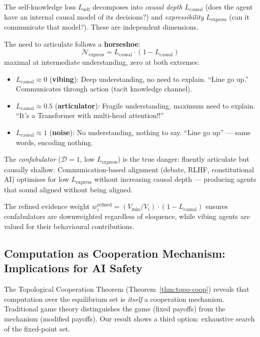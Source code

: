 \documentclass[11pt,a4paper]{article}
\begin{document}
The self-knowledge loss $L_{\text{self}}$ decomposes into \emph{causal depth} $L_{\text{causal}}$ (does the agent have an internal causal model of its decisions?) and \emph{expressibility} $L_{\text{express}}$ (can it communicate that model?). These are independent dimensions.

The need to articulate follows a \textbf{horseshoe}:
\begin{equation*}
    \mathcal{N}_{\text{express}} = L_{\text{causal}} \cdot (1 - L_{\text{causal}})
\end{equation*}
maximal at intermediate understanding, zero at both extremes:
\begin{itemize}
    \item $L_{\text{causal}} \approx 0$ (\textbf{vibing}): Deep understanding, no need to explain. ``Line go up.'' Communicates through action (tacit knowledge channel).
    \item $L_{\text{causal}} \approx 0.5$ (\textbf{articulator}): Fragile understanding, maximum need to explain. ``It's a Transformer with multi-head attention!!''
    \item $L_{\text{causal}} \approx 1$ (\textbf{noise}): No understanding, nothing to say. ``Line go up'' --- same words, encoding nothing.
\end{itemize}

The \emph{confabulator} ($\mathcal{D} = 1$, low $L_{\text{express}}$) is the true danger: fluently articulate but causally shallow. Communication-based alignment (debate, RLHF, constitutional AI) optimises for low $L_{\text{express}}$ without increasing causal depth --- producing agents that sound aligned without being aligned.

The refined evidence weight $w_i^{\text{refined}} = (V_{\min}/V_i) \cdot (1 - L_{\text{causal}})$ ensures confabulators are downweighted regardless of eloquence, while vibing agents are valued for their behavioural contributions.

\subsection{Computation as Cooperation Mechanism: Implications for AI Safety}

The Topological Cooperation Theorem (Theorem~\ref{thm:topo-coop})
reveals that computation over the equilibrium set is \emph{itself} a
cooperation mechanism. Traditional game theory distinguishes the game
(fixed payoffs) from the mechanism (modified payoffs). Our result
shows a third option: exhaustive search of the fixed-point set.
\end{document}
